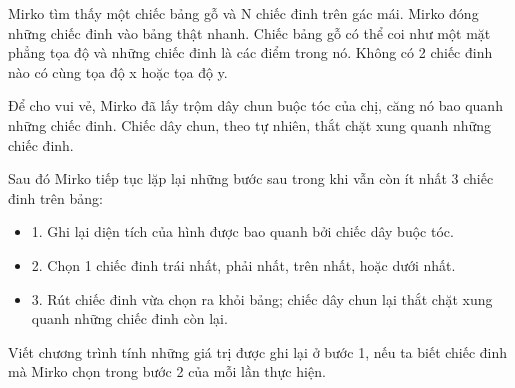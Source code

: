 Mirko tìm thấy một chiếc bảng gỗ và N chiếc đinh trên gác mái. Mirko đóng những chiếc đinh vào bảng thật nhanh. Chiếc bảng gỗ có thể coi như một mặt phẳng tọa độ và những chiếc đinh là các điểm trong nó. Không có 2 chiếc đinh nào có cùng tọa độ x hoặc tọa độ y.  

   Để cho vui vẻ, Mirko đã lấy trộm dây chun buộc tóc của chị, căng nó bao quanh những chiếc đinh. Chiếc dây chun, theo tự nhiên, thắt chặt xung quanh những chiếc đinh.  

   Sau đó Mirko tiếp tục lặp lại những bước sau trong khi vẫn còn ít nhất 3 chiếc đinh trên bảng:  
\begin{itemize}
	\item     1. Ghi lại diện tích của hình được bao quanh bởi chiếc dây buộc tóc.   
	\item     2. Chọn 1 chiếc đinh trái nhất, phải nhất, trên nhất, hoặc dưới nhất.   
	\item     3. Rút chiếc đinh vừa chọn ra khỏi bảng; chiếc dây chun lại thắt chặt xung quanh những chiếc đinh còn lại.   
\end{itemize}  Viết chương trình tính những giá trị được ghi lại ở bước 1, nếu ta biết chiếc đinh mà Mirko chọn trong bước 2 của mỗi lần thực hiện.